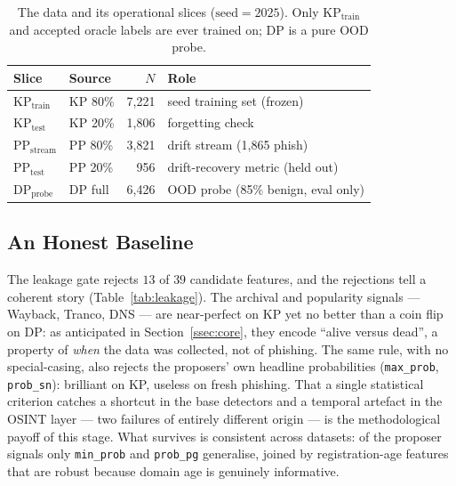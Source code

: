 \begin{table}[H]
\centering
\caption{The data and its operational slices ($\mathrm{seed}=2025$). Only
$\mathrm{KP_{train}}$ and accepted oracle labels are ever trained on; DP is a
pure OOD probe.}
\label{tab:data}
\small
\begin{tabular}{@{}llrl@{}}
\toprule
Slice & Source & $N$ & Role \\
\midrule
$\mathrm{KP_{train}}$ & KP 80\% & 7{,}221 & seed training set (frozen) \\
$\mathrm{KP_{test}}$  & KP 20\% & 1{,}806 & forgetting check \\
$\mathrm{PP_{stream}}$ & PP 80\% & 3{,}821 & drift stream (1{,}865 phish) \\
$\mathrm{PP_{test}}$  & PP 20\% & 956 & drift-recovery metric (held out) \\
$\mathrm{DP_{probe}}$ & DP full & 6{,}426 & OOD probe (85\% benign, eval only) \\
\bottomrule
\end{tabular}
\end{table}

\subsection{An Honest Baseline}
\label{ssec:eval-gate}

The leakage gate rejects $13$ of $39$ candidate features, and the rejections
tell a coherent story (Table~\ref{tab:leakage}). The archival and popularity
signals --- Wayback, Tranco, DNS --- are near-perfect on KP yet no better than a
coin flip on DP: as anticipated in Section~\ref{ssec:core}, they encode
``alive versus dead'', a property of \emph{when} the data was collected, not of
phishing. The same rule, with no special-casing, also rejects the proposers'
own headline probabilities (\texttt{max\_prob}, \texttt{prob\_sn}): brilliant on
KP, useless on fresh phishing. That a single statistical criterion catches a
shortcut in the base detectors and a temporal artefact in the OSINT layer ---
two failures of entirely different origin --- is the methodological payoff of
this stage. What survives is consistent across datasets: of the proposer
signals only \texttt{min\_prob} and \texttt{prob\_pg} generalise, joined by
registration-age features that are robust because domain age is genuinely
informative.

